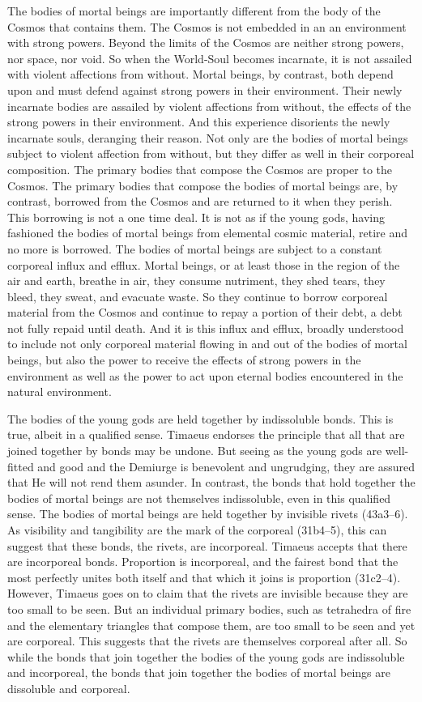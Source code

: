 The bodies of mortal beings are importantly different from the body of the Cosmos that contains them. The Cosmos is not embedded in an an environment with strong powers. Beyond the limits of the Cosmos are neither strong powers, nor space, nor void. So when the World-Soul becomes incarnate, it is not assailed with violent affections from without. Mortal beings, by contrast, both depend upon and must defend against strong powers in their environment. Their newly incarnate bodies are assailed by violent affections from without, the effects of the strong powers in their environment. And this experience disorients the newly incarnate souls, deranging their reason. Not only are the bodies of mortal beings subject to violent affection from without, but they differ as well in their corporeal composition. The primary bodies that compose the Cosmos are proper to the Cosmos. The primary bodies that compose the bodies of mortal beings are, by contrast, borrowed from the Cosmos and are returned to it when they perish. This borrowing is not a one time deal. It is not as if the young gods, having fashioned the bodies of mortal beings from elemental cosmic material, retire and no more is borrowed. The bodies of mortal beings are subject to a constant corporeal influx and efflux. Mortal beings, or at least those in the region of the air and earth, breathe in air, they consume nutriment, they shed tears, they bleed, they sweat, and evacuate waste. So they continue to borrow corporeal material from the Cosmos and continue to repay a portion of their debt, a debt not fully repaid until death. And it is this influx and efflux, broadly understood to include not only corporeal material flowing in and out of the bodies of mortal beings, but also the power to receive the effects of strong powers in the environment as well as the power to act upon eternal bodies encountered in the natural environment.

The bodies of the young gods are held together by indissoluble bonds. This is true, albeit in a qualified sense. Timaeus endorses the principle that all that are joined together by bonds may be undone. But seeing as the young gods are well-fitted and good and the Demiurge is benevolent and ungrudging, they are assured that He will not rend them asunder. In contrast, the bonds that hold together the bodies of mortal beings are not themselves indissoluble, even in this qualified sense. The bodies of mortal beings are held together by invisible rivets (43a3--6). As visibility and tangibility are the mark of the corporeal (31b4–5), this can suggest that these bonds, the rivets, are incorporeal. Timaeus accepts that there are incorporeal bonds. Proportion is incorporeal, and the fairest bond that the most perfectly unites both itself and that which it joins is proportion (31c2–4). However, Timaeus goes on to claim that the rivets are invisible because they are too small to be seen. But an individual primary bodies, such as tetrahedra of fire and the elementary triangles that compose them, are too small to be seen and yet are corporeal. This suggests that the rivets are themselves corporeal after all. So while the bonds that join together the bodies of the young gods are indissoluble and incorporeal, the bonds that join together the bodies of mortal beings are dissoluble and corporeal.

